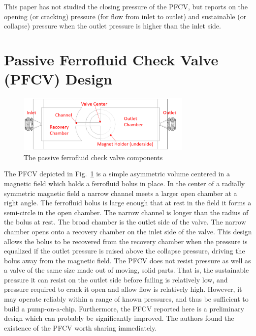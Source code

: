\documentclass[]{asme2ej}
\begin{document}
This paper has not studied the closing pressure of the PFCV, but reports on
the opening (or cracking) pressure (for flow from inlet to outlet) and
sustainable (or collapse) pressure
when the outlet pressure is higher than the inlet side.

\section{Passive Ferrofluid Check Valve (PFCV) Design}
\begin{figure}
\centerline{\includegraphics[width=3.34in]{figure/Figure1.png}}
\caption{The passive ferrofluid check valve components}
\label{fig_components}
\end{figure}

The PFCV depicted in Fig.~\ref{fig_components} is a simple asymmetric volume
centered in a magnetic field
which holds a ferrofluid bolus in place.
In the center of a radially symmetric magnetic field
a narrow channel meets a larger open chamber at a right angle.
The ferrofluid bolus is large enough that at rest in the field it
forms a semi-circle in the open chamber. The narrow channel is
longer than the radius of the bolus at rest.
The broad chamber is the outlet side of the valve.
The narrow chamber opens onto a recovery chamber on the inlet
side of the valve.
This design allows the bolus to be recovered from the recovery
chamber when the pressure is equalized if the outlet pressure is
raised above the collapse pressure, driving the bolus away
from the magnetic field.
The PFCV does not resist pressure as well  as a
valve of the same size
made out of moving, solid parts.
That is, the sustainable
pressure it can resist on the outlet side before failing is relatively
low, and pressure required to crack it open and allow flow is
relatively high.
However, it may operate reliably within a range of
known pressures, and thus be sufficient to build a
pump-on-a-chip.
Furthermore, the PFCV reported here is a preliminary design which
can probably be significantly improved.
The authors found the
existence of the PFCV worth sharing immediately.
\end{document}
